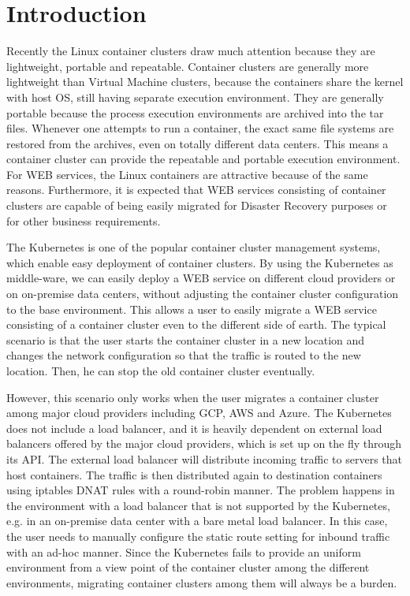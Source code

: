 \section{Introduction}

Recently the Linux container clusters draw much attention because they are lightweight, portable and repeatable.
Container clusters are generally more lightweight than Virtual Machine clusters, 
because the containers share the kernel with host OS, still having separate execution environment. 
They are generally portable because the process execution environments are archived into the tar files.
Whenever one attempts to run a container, the exact same file systems are restored from the archives, 
even on totally different data centers. 
This means a container cluster can provide the repeatable and portable execution environment.
For WEB services, the Linux containers are attractive because of the same reasons. 
Furthermore, it is expected that WEB services consisting of container clusters are 
capable of being easily migrated for Disaster Recovery purposes or for other business requirements.

The Kubernetes\cite{K8s2017} is one of the popular container cluster management systems, 
which enable easy deployment of container clusters.
By using the Kubernetes as middle-ware, we can easily deploy a WEB service on different 
cloud providers or on on-premise data centers, without adjusting the container cluster configuration to the base environment. 
This allows a user to easily migrate a WEB service consisting of a container cluster even to the different side of earth. 
The typical scenario is that the user starts the container cluster in a new location and changes the network configuration 
so that the traffic is routed to the new location. Then, he can stop the old container cluster eventually.

However, this scenario only works when the user migrates a container cluster among major cloud providers including GCP, AWS and Azure.
The Kubernetes does not include a load balancer, and it is heavily dependent on external load balancers offered by the major cloud providers, 
which is set up on the fly through its API. 
The external load balancer will distribute incoming traffic to servers that host containers.
The traffic is then distributed again to destination containers using iptables DNAT\cite{MartinA.Brown2017,Marmol2015} 
rules with a round-robin manner. 
The problem happens in the environment with a load balancer that is not supported by the Kubernetes, 
e.g. in an on-premise data center with a bare metal load balancer. 
In this case, the user needs to manually configure 
the static route setting for inbound traffic with an ad-hoc manner. 
Since the Kubernetes fails to provide an uniform environment from a view point of the container cluster among the different environments,
migrating container clusters among them will always be a burden.

